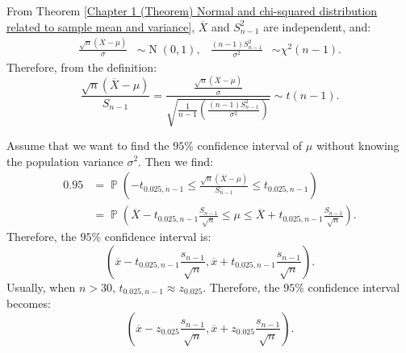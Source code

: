 \documentclass{huhtakm-template-book-v2}
\DeclareMathOperator{\prob}{\mathbb{P}}
\DeclareMathOperator{\N}{N}
\begin{document}
    \begin{proofing}
        From Theorem \ref{Chapter 1 (Theorem) Normal and chi-squared distribution related to sample mean and variance}, $\overline{X}$ and $S_{n-1}^{2}$ are independent, and:
        \begin{align*}
            \frac{\sqrt{n}(\overline{X} - \mu)}{\sigma} &\sim \N(0, 1), & \frac{(n - 1) S_{n-1}^{2}}{\sigma^{2}} &\sim \chi^{2}(n - 1).
        \end{align*}
        Therefore, from the definition:
        \begin{equation*}
            \frac{\sqrt{n}(\overline{X} - \mu)}{S_{n-1}} = \frac{\frac{\sqrt{n}(\overline{X} - \mu)}{\sigma}}{\sqrt{\frac{1}{n - 1} \left(\frac{(n - 1) S_{n-1}^{2}}{\sigma^{2}}\right)}} \sim t(n - 1).
        \end{equation*}
    \end{proofing}
    \begin{eg}
        Assume that we want to find the $95\%$ confidence interval of $\mu$ without knowing the population variance $\sigma^{2}$. Then we find:
        \begin{align*}
            0.95 &= \prob\left(-t_{0.025, n - 1} \leq \frac{\sqrt{n}(\overline{X} - \mu)}{S_{n-1}} \leq t_{0.025, n - 1}\right)\\
            &= \prob\left(\overline{X} - t_{0.025, n - 1} \frac{S_{n-1}}{\sqrt{n}} \leq \mu \leq \overline{X} + t_{0.025, n - 1} \frac{S_{n-1}}{\sqrt{n}}\right).
        \end{align*}
        Therefore, the $95\%$ confidence interval is:
        \begin{equation*}
            \left(\overline{x} - t_{0.025, n - 1} \frac{s_{n-1}}{\sqrt{n}}, \overline{x} + t_{0.025, n - 1} \frac{s_{n-1}}{\sqrt{n}}\right).
        \end{equation*}
        Usually, when $n > 30$, $t_{0.025, n - 1} \approx z_{0.025}$. Therefore, the $95\%$ confidence interval becomes:
        \begin{equation*}
            \left(\overline{x} - z_{0.025} \frac{s_{n-1}}{\sqrt{n}}, \overline{x} + z_{0.025} \frac{s_{n-1}}{\sqrt{n}}\right).
        \end{equation*}
    \end{eg}
    \newpage
    
\end{document}
